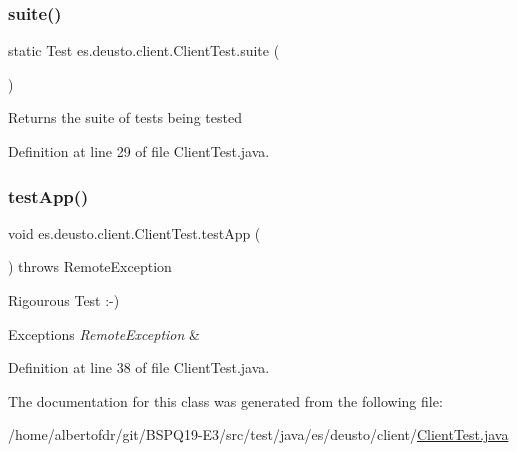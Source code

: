 \subsubsection{\texorpdfstring{suite()}{suite()}}
{\footnotesize\ttfamily static Test es.\+deusto.\+client.\+Client\+Test.\+suite (\begin{DoxyParamCaption}{ }\end{DoxyParamCaption})\hspace{0.3cm}{\ttfamily [static]}}

\begin{DoxyReturn}{Returns}
the suite of tests being tested 
\end{DoxyReturn}


Definition at line 29 of file Client\+Test.\+java.

\mbox{\label{classes_1_1deusto_1_1client_1_1_client_test_af869b513820b21f952c9754d3aea8d97}} 
\subsubsection{\texorpdfstring{test\+App()}{testApp()}}
{\footnotesize\ttfamily void es.\+deusto.\+client.\+Client\+Test.\+test\+App (\begin{DoxyParamCaption}{ }\end{DoxyParamCaption}) throws Remote\+Exception}

Rigourous Test \+:-\/)


\begin{DoxyExceptions}{Exceptions}
{\em Remote\+Exception} & \\
\hline
\end{DoxyExceptions}


Definition at line 38 of file Client\+Test.\+java.



The documentation for this class was generated from the following file\+:\begin{DoxyCompactItemize}
\item 
/home/albertofdr/git/\+B\+S\+P\+Q19-\/\+E3/src/test/java/es/deusto/client/\hyperlink{_client_test_8java}{Client\+Test.\+java}\end{DoxyCompactItemize}
